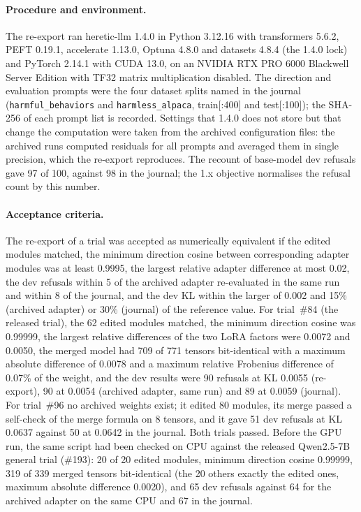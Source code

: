 \paragraph{Procedure and environment.} The re-export ran heretic-llm 1.4.0 in Python 3.12.16 with transformers
5.6.2, PEFT 0.19.1, accelerate 1.13.0, Optuna 4.8.0 and datasets 4.8.4 (the 1.4.0 lock) and PyTorch 2.14.1 with
CUDA 13.0, on an NVIDIA RTX PRO 6000 Blackwell Server Edition with TF32 matrix multiplication disabled. The direction
and evaluation prompts were the four dataset splits named in the journal (\texttt{harmful\_behaviors} and
\texttt{harmless\_alpaca}, train[:400] and test[:100]); the SHA-256 of each prompt list is recorded. Settings that
1.4.0 does not store but that change the computation were taken from the archived configuration files: the archived
runs computed residuals for all prompts and averaged them in single precision, which the re-export reproduces. The
recount of base-model dev refusals gave 97 of 100, against 98 in the journal; the 1.x objective normalises the
refusal count by this number.

\paragraph{Acceptance criteria.} The re-export of a trial was accepted as numerically equivalent if the edited
modules matched, the minimum direction cosine between corresponding adapter modules was at least 0.9995, the largest
relative adapter difference at most 0.02, the dev refusals within 5 of the archived adapter re-evaluated in the same
run and within 8 of the journal, and the dev KL within the larger of 0.002 and 15\% (archived adapter) or 30\%
(journal) of the reference value. For trial~\#84 (the released trial), the 62
edited modules matched, the minimum direction cosine was 0.99999, the largest relative differences of the two LoRA
factors were 0.0072 and 0.0050, the merged model had 709 of 771 tensors bit-identical with a maximum absolute
difference of 0.0078 and a maximum relative Frobenius difference of 0.07\% of the weight, and the dev results were
90 refusals at KL 0.0055 (re-export), 90 at 0.0054 (archived adapter, same run) and 89 at 0.0059 (journal). For
trial~\#96 no archived weights exist; it edited 80 modules, its merge passed a self-check of the merge formula on 8
tensors, and it gave 51 dev refusals at KL 0.0637 against 50 at 0.0642 in the journal. Both trials passed. Before
the GPU run, the same script had been checked on CPU against the released Qwen2.5-7B general trial (\#193): 20 of 20
edited modules, minimum direction cosine 0.99999, 319 of 339 merged tensors bit-identical (the 20 others exactly the
edited ones, maximum absolute difference 0.0020), and 65 dev refusals against 64 for the archived adapter on the same
CPU and 67 in the journal.

